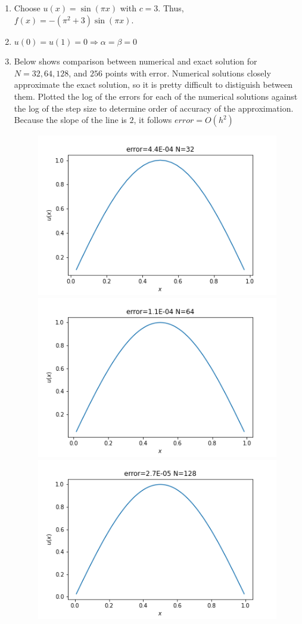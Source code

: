 \documentclass[10pt]{article}
\begin{document}
\begin{enumerate}[label=(\alph*)]
    \item Choose $u(x)=\sin(\pi x)$ with $c=3$. Thus, $f(x)=-(\pi^2+3)\sin(\pi x)$.
    \item $u(0)=u(1)=0\Rightarrow \alpha=\beta=0$
    \item Below shows comparison between numerical and exact solution for $N=32,64,128$, and $256$ points with error. 
    Numerical solutions closely approximate the exact solution, so it is pretty difficult to distiguish between them.
    Plotted the log of the errors for each of the numerical solutions against the log of the step size to determine order of accuracy of the approximation. 
    Because the slope of the line is $2$, it follows $error=O(h^2)$
    \begin{figure}[H]
        \includegraphics[scale=0.33]{hw_6_q_5_N_32.png}
        \includegraphics[scale=0.33]{hw_6_q_5_N_64.png}
        \includegraphics[scale=0.33]{hw_6_q_5_N_128.png}

\end{figure}
\end{enumerate}
\end{document}
